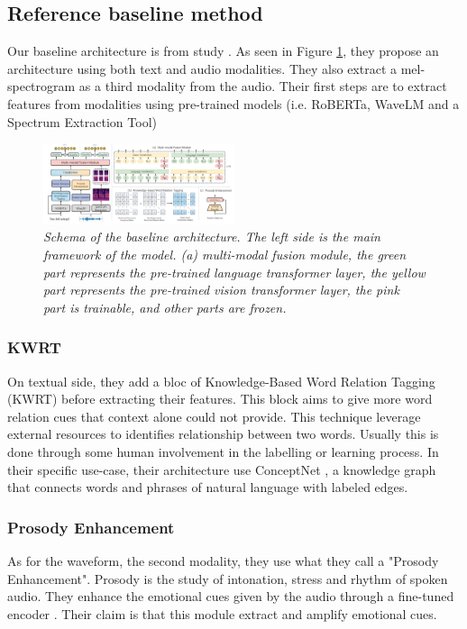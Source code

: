 \documentclass{article}
\begin{document}
\subsection{Reference baseline method}

Our baseline architecture is from study \cite{ERCFusionModel}.
As seen in Figure \ref{fig:BaselineArchitecture}, they propose an architecture using both text and audio modalities. They also extract a mel-spectrogram as a third modality from the audio. Their first steps are to extract features from modalities using pre-trained models (i.e. RoBERTa, WaveLM and a Spectrum Extraction Tool)

\begin{figure}[htbp]
  \centering
  \includegraphics[width=0.5\textwidth]{Images/EPCFusion_BaselineArchitecture.png}
  \caption{\textit{Schema of the baseline architecture. The left side is the main framework of the model. (a) multi-modal fusion module, the green part represents the pre-trained
language transformer layer, the yellow part represents the pre-trained vision transformer layer, the pink part is trainable, and other
parts are frozen.}}
  \label{fig:BaselineArchitecture}
\end{figure}

\subsubsection{KWRT}
On textual side, they add a bloc of Knowledge-Based Word Relation Tagging (KWRT) before extracting their features. This block aims to give more word relation cues that context alone could not provide. This technique leverage external resources to identifies relationship between two words. Usually this is done through some human involvement in the labelling or learning process. In their specific use-case, their architecture use ConceptNet \cite{speer2018conceptnet}, a knowledge graph that connects words and phrases of natural language with labeled edges.

\subsubsection{Prosody Enhancement}
As for the waveform, the second modality, they use what they call a "Prosody Enhancement". Prosody is the study of intonation, stress and rhythm of spoken audio. They enhance the emotional cues given by the audio through a fine-tuned encoder \cite{yang2022speech}. Their claim is that this module extract and amplify emotional cues.
\end{document}
